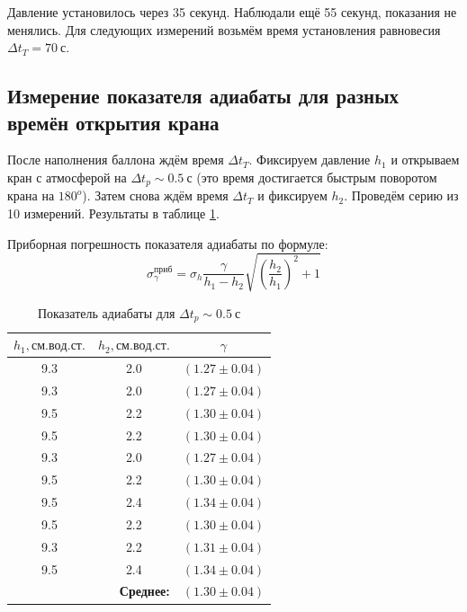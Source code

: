 \documentclass[a4paper, 12pt]{article}
\begin{document}
			Давление установилось через 35 секунд. Наблюдали ещё 55 секунд, показания не менялись. Для следующих измерений возьмём время установления равновесия $\Delta t_T = 70~с$.

		\subsection{Измерение показателя адиабаты для разных времён открытия крана}

			После наполнения баллона ждём время $\Delta t_T$. Фиксируем давление $h_1$ и открываем кран с атмосферой на $\Delta t_p \sim 0.5~с$ (это время достигается быстрым поворотом крана на $180^o$). Затем снова ждём время $\Delta t_T$ и фиксируем $h_2$. Проведём серию из 10 измерений. Результаты в таблице \ref{table:gamma_1}.

			Приборная погрешность показателя адиабаты по формуле:
			$$
				\sigma_{\gamma}^{приб} = \sigma_h \frac{\gamma}{h_1 - h_2} \sqrt{\left( \frac{h_2}{h_1} \right)^2 + 1}
			$$

			\begin{table}[!ht]
				\centering
				\begin{tabular}{|c|c|c|}
					\hline

					$h_1, см.вод.ст.$ & $h_2, см.вод.ст.$ & $\gamma$\\ \hline
					9.3 & 2.0 & $(1.27 \pm 0.04)$\\ \hline
					9.3 & 2.0 & $(1.27 \pm 0.04)$\\ \hline
					9.5 & 2.2 & $(1.30 \pm 0.04)$\\ \hline
					9.5 & 2.2 & $(1.30 \pm 0.04)$\\ \hline
					9.3 & 2.0 & $(1.27 \pm 0.04)$\\ \hline
					9.5 & 2.2 & $(1.30 \pm 0.04)$\\ \hline
					9.5 & 2.4 & $(1.34 \pm 0.04)$\\ \hline
					9.5 & 2.2 & $(1.30 \pm 0.04)$\\ \hline
					9.3 & 2.2 & $(1.31 \pm 0.04)$\\ \hline
					9.5 & 2.4 & $(1.34 \pm 0.04)$\\ \hline
					\multicolumn{2}{|r|}{\textbf{Среднее:}} & $\boldsymbol{(1.30 \pm 0.04)}$ \\ \hline

				\end{tabular}
				\caption{Показатель адиабаты для $\Delta t_p \sim 0.5~с$}
				\label{table:gamma_1}
			\end{table}
\end{document}
